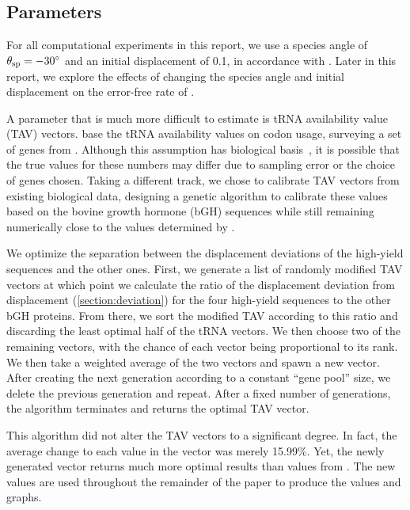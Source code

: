 \documentclass[12pt, draft]{article}
\numberwithin{equation}{section}
\begin{document}
\subsection{Parameters}
\label{section:parameters}
For all computational experiments in this report, we use a species
angle of $\theta_{\rm{sp}} = -30^\circ$ and an initial displacement of 0.1,
in accordance with \citet{lalit:embs}.  Later in this report, we explore
the effects of changing the species angle and initial displacement on the
error-free rate of \prfB.

A parameter that is much more difficult to estimate
is tRNA availability value (TAV) vectors.
\citeauthor{lalit:embs} base the tRNA availability values on codon usage, 
surveying a set of genes from \ecoli.
Although this assumption has biological basis~\cite{ikemura}, 
it is possible that the true values for these numbers may differ 
due to sampling error or the choice of genes chosen.
Taking a different track, we chose to calibrate TAV vectors from
existing biological data, designing a genetic algorithm to calibrate
these values based on the bovine growth hormone (bGH) sequences
while still remaining numerically close to the values determined by \citeauthor{lalit:embs}.

We optimize the separation between the displacement deviations of the 
high-yield sequences and the other ones.  
First, we generate a list of randomly modified TAV vectors at which
point we calculate the ratio of the displacement deviation from
displacement (\autoref{section:deviation}) for the four high-yield 
sequences to the other bGH proteins. From there, we sort the 
modified TAV according to this ratio and discarding the least 
optimal half of the tRNA vectors. We then choose two of the 
remaining vectors, with the chance of each vector being proportional
 to its rank.  We then take a weighted average of the two vectors 
 and spawn a new vector.  After creating the next generation according 
 to a constant ``gene pool'' size, we delete the previous generation 
 and repeat. After a fixed number of generations, the algorithm 
 terminates and returns the optimal TAV vector.

This algorithm did not alter the TAV vectors to a significant degree.
In fact, the average change to each value in the vector was merely
15.99\%.  Yet, the newly generated vector returns much more optimal
results than values from \citeauthor{lalit:embs}.  The new values
are used throughout the remainder of the paper to produce the 
values and graphs.
\end{document}
